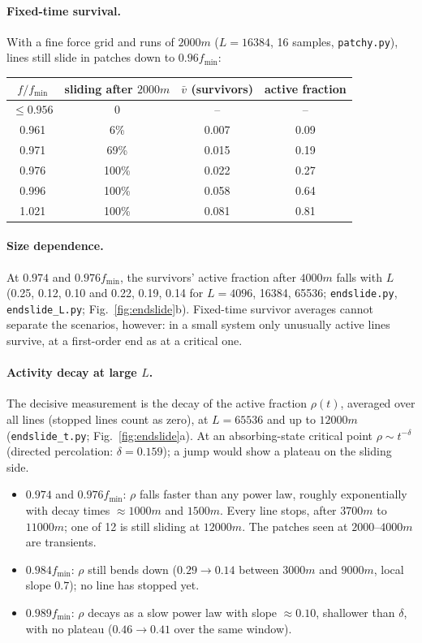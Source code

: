 \documentclass[10pt,a4paper]{article}
\begin{document}
\paragraph{Fixed-time survival.}
With a fine force grid and runs of $2000m$ ($L=16384$, 16 samples, \texttt{patchy.py}), lines still slide in patches down to $0.96f_{\min}$:

\begin{center}\small
\begin{tabular}{cccc}
\toprule
$f/f_{\min}$ & sliding after $2000m$ & $\bar v$ (survivors) & active fraction \\
\midrule
$\le0.956$ & 0 & -- & -- \\
0.961 & 6\% & 0.007 & 0.09 \\
0.971 & 69\% & 0.015 & 0.19 \\
0.976 & 100\% & 0.022 & 0.27 \\
0.996 & 100\% & 0.058 & 0.64 \\
1.021 & 100\% & 0.081 & 0.81 \\
\bottomrule
\end{tabular}
\end{center}

\paragraph{Size dependence.}
At $0.974$ and $0.976f_{\min}$, the survivors' active fraction after $4000m$ falls with $L$ (0.25, 0.12, 0.10 and 0.22, 0.19, 0.14 for $L=4096$, 16384, 65536; \texttt{endslide.py}, \texttt{endslide\_L.py}; Fig.~\ref{fig:endslide}b). Fixed-time survivor averages cannot separate the scenarios, however: in a small system only unusually active lines survive, at a first-order end as at a critical one.

\paragraph{Activity decay at large $L$.}
The decisive measurement is the decay of the active fraction $\rho(t)$, averaged over all lines (stopped lines count as zero), at $L=65536$ and up to $12000m$ (\texttt{endslide\_t.py}; Fig.~\ref{fig:endslide}a). At an absorbing-state critical point $\rho\sim t^{-\delta}$ (directed percolation: $\delta=0.159$); a jump would show a plateau on the sliding side.
\begin{itemize}
\item $0.974$ and $0.976f_{\min}$: $\rho$ falls faster than any power law, roughly exponentially with decay times $\approx1000m$ and $1500m$. Every line stops, after $3700m$ to $11000m$; one of 12 is still sliding at $12000m$. The patches seen at $2000$--$4000m$ are transients.
\item $0.984f_{\min}$: $\rho$ still bends down ($0.29\to0.14$ between $3000m$ and $9000m$, local slope $0.7$); no line has stopped yet.
\item $0.989f_{\min}$: $\rho$ decays as a slow power law with slope $\approx0.10$, shallower than $\delta$, with no plateau ($0.46\to0.41$ over the same window).
\end{itemize}
\end{document}
